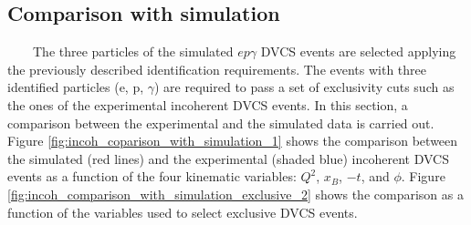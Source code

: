 \subsection{Comparison with simulation}
~~~~The three particles of the simulated $ep\gamma$ DVCS events are selected 
applying the previously described identification requirements. The events with 
three identified particles (e, p, $\gamma$) are required to pass a set of 
exclusivity cuts such as the ones of the experimental incoherent DVCS events.  
In this section, a comparison between the experimental and the simulated data 
is carried out.\\

Figure \ref{fig:incoh_coparison_with_simulation_1} shows the comparison between 
the simulated (red lines) and the experimental (shaded blue) incoherent DVCS 
events as a function of the four kinematic variables: $Q^{2}$, $x_{B}$, $-t$, 
and $\phi$. Figure \ref{fig:incoh_comparison_with_simulation_exclusive_2} shows 
the comparison as a function of the variables used to select exclusive DVCS 
events.
